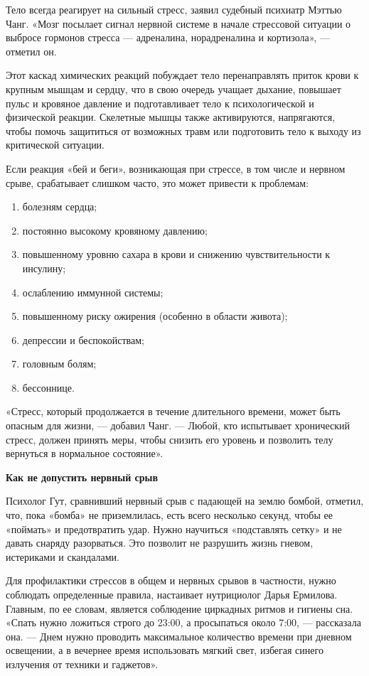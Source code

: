 Тело всегда реагирует на сильный стресс, заявил судебный психиатр Мэттью Чанг. «Мозг посылает сигнал нервной системе в начале стрессовой ситуации о выбросе гормонов стресса — адреналина, норадреналина и кортизола», — отметил он.

Этот каскад химических реакций побуждает тело перенаправлять приток крови к крупным мышцам и сердцу, что в свою очередь учащает дыхание, повышает пульс и кровяное давление и подготавливает тело к психологической и физической реакции. Скелетные мышцы также активируются, напрягаются, чтобы помочь защититься от возможных травм или подготовить тело к выходу из критической ситуации.

Если реакция «бей и беги», возникающая при стрессе, в том числе и нервном срыве, срабатывает слишком часто, это может привести к проблемам:

\begin{enumerate}
    \item болезням сердца;
    \item постоянно высокому кровяному давлению;
    \item повышенному уровню сахара в крови и снижению чувствительности к инсулину;
    \item ослаблению иммунной системы;
    \item повышенному риску ожирения (особенно в области живота);
    \item депрессии и беспокойствам;
    \item головным болям;
    \item бессоннице.
\end{enumerate}

«Стресс, который продолжается в течение длительного времени, может быть опасным для жизни, — добавил Чанг. — Любой, кто испытывает хронический стресс, должен принять меры, чтобы снизить его уровень и позволить телу вернуться в нормальное состояние».

\textbf{Как не допустить нервный срыв}

Психолог Гут, сравнивший нервный срыв с падающей на землю бомбой, отметил, что, пока «бомба» не приземлилась, есть всего несколько секунд, чтобы ее «поймать» и предотвратить удар. Нужно научиться «подставлять сетку» и не давать снаряду разорваться. Это позволит не разрушить жизнь гневом, истериками и скандалами.

Для профилактики стрессов в общем и нервных срывов в частности, нужно соблюдать определенные правила, настаивает нутрициолог Дарья Ермилова. Главным, по ее словам, является соблюдение циркадных ритмов и гигиены сна. «Спать нужно ложиться строго до 23:00, а просыпаться около 7:00, — рассказала она. — Днем нужно проводить максимальное количество времени при дневном освещении, а в вечернее время использовать мягкий свет, избегая синего излучения от техники и гаджетов».

